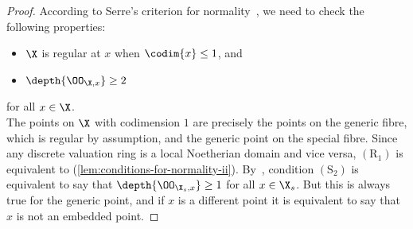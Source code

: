 \begin{proof}
    According to Serre's criterion for normality~\cite[Theorem 8.2.23]{Liu},
    we need to check the following properties:
    \begin{itemize}
        \item[$(\mathrm{R}_1)$] $\X$ is regular at $x$ when $\codim{x} \leq 1$, and
        \item[$(\mathrm{S}_2)$] $\depth{\OO_{\X,x}} \geq 2$
    \end{itemize}
    for all $x\in \X$. \\
    The points on $\X$ with codimension $1$ are precisely the points on the generic fibre, which is regular by assumption,
    and the generic point on the special fibre.
    Since any discrete valuation ring is a local Noetherian domain and vice versa, $(\mathrm{R}_1)$ is
    equivalent to (\ref{lem:conditions-for-normality-ii}).
    By~\cite[Proposition 8.2.11]{Liu}, condition $(\mathrm{S}_2)$ is equivalent to say
    that $\depth{\OO_{\X_s, x}} \geq 1$ for all $x \in \X_s$.
    But this is always true for the generic point, and if $x$ is a different point it is equivalent to say that $x$ is not an embedded point.
\end{proof}

